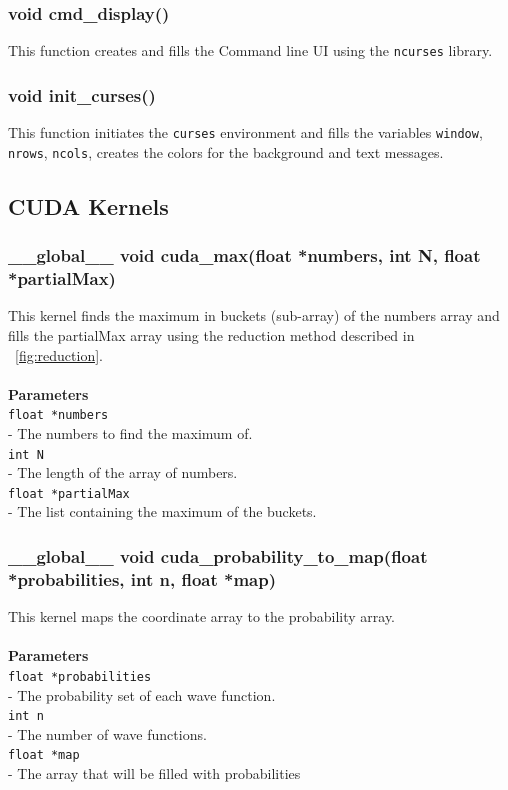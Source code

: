 \documentclass[a4paper, 10pt]{article}
\def\mar{\hspace*{5mm}}
\begin{document}
        \vspace{1cm}
        \subsubsection{void cmd\_display()}
        This function creates and fills the Command line UI using the \verb|ncurses| library.

        \vspace{1cm}
        \subsubsection{void init\_curses()}
        This function initiates the \verb|curses| environment and fills the variables \verb|window|,
        \verb|nrows|, \verb|ncols|, creates the colors for the background and text messages.

    
    \newpage
    \subsection{CUDA Kernels}
        \vspace{1cm}
        \subsubsection{\_\_global\_\_ void cuda\_max(float *numbers, int N, float *partialMax)}
        This kernel finds the maximum in buckets (sub-array) of the numbers array and
        fills the partialMax array using the reduction method described in ~\ref{fig:reduction}.
        \\\\{\bf Parameters}\\
        \verb|float *numbers|\\\mar- The numbers to find the maximum of.\\
        \verb|int N|\\\mar- The length of the array of numbers.\\
        \verb|float *partialMax|\\\mar- The list containing the maximum of the buckets.

        \vspace{1cm}
        \subsubsection{\_\_global\_\_ void cuda\_probability\_to\_map(float *probabilities, int n,
        float *map)}
        This kernel maps the coordinate array to the probability array.\\
        \\{\bf Parameters}\\
        \verb|float *probabilities|\\\mar- The probability set of each wave function.\\
        \verb|int n|\\\mar- The number of wave functions.\\
        \verb|float *map|\\\mar- The array that will be filled with probabilities
\end{document}
